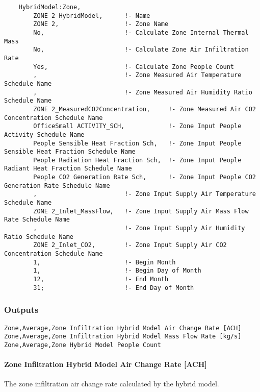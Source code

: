 \begin{lstlisting}
    HybridModel:Zone,
        ZONE 2 HybridModel,      !- Name
        ZONE 2,                  !- Zone Name
        No,                      !- Calculate Zone Internal Thermal Mass
        No,                      !- Calculate Zone Air Infiltration Rate
        Yes,                     !- Calculate Zone People Count
        ,                        !- Zone Measured Air Temperature Schedule Name
        ,                        !- Zone Measured Air Humidity Ratio Schedule Name
        ZONE 2_MeasuredCO2Concentration,     !- Zone Measured Air CO2 Concentration Schedule Name
        OfficeSmall ACTIVITY_SCH,            !- Zone Input People Activity Schedule Name
        People Sensible Heat Fraction Sch,   !- Zone Input People Sensible Heat Fraction Schedule Name
        People Radiation Heat Fraction Sch,  !- Zone Input People Radiant Heat Fraction Schedule Name
        People CO2 Generation Rate Sch,      !- Zone Input People CO2 Generation Rate Schedule Name
        ,                        !- Zone Input Supply Air Temperature Schedule Name
        ZONE 2_Inlet_MassFlow,   !- Zone Input Supply Air Mass Flow Rate Schedule Name
        ,                        !- Zone Input Supply Air Humidity Ratio Schedule Name
        ZONE 2_Inlet_CO2,        !- Zone Input Supply Air CO2 Concentration Schedule Name
        1,                       !- Begin Month
        1,                       !- Begin Day of Month
        12,                      !- End Month
        31;                      !- End Day of Month

\end{lstlisting}


\subsubsection{Outputs}\label{outputs-030}

\begin{lstlisting}
Zone,Average,Zone Infiltration Hybrid Model Air Change Rate [ACH]
Zone,Average,Zone Infiltration Hybrid Model Mass Flow Rate [kg/s]
Zone,Average,Zone Hybrid Model People Count
\end{lstlisting}

\paragraph{Zone Infiltration Hybrid Model Air Change Rate {[}ACH{]}}\label{zone-infiltration-hybrid-model-air-change-rate}

The zone infiltration air change rate calculated by the hybrid model.

